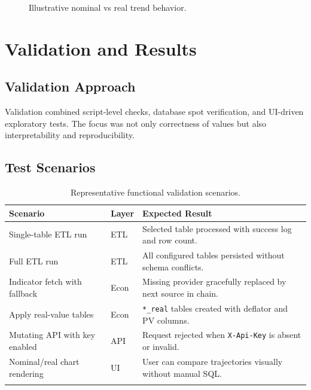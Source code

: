 \documentclass[12pt,a4paper]{report}
\begin{document}
\begin{figure}[H]
\centering
{}
\caption{Illustrative nominal vs real trend behavior.}
\end{figure}

\chapter{Validation and Results}
\section{Validation Approach}
Validation combined script-level checks, database spot verification, and UI-driven exploratory tests. The focus was not only correctness of values but also interpretability and reproducibility.

\section{Test Scenarios}
\begin{longtable}{p{}p{}p{}}
\toprule
\textbf{Scenario} & \textbf{Layer} & \textbf{Expected Result} \\
\midrule
Single-table ETL run & ETL & Selected table processed with success log and row count. \\
Full ETL run & ETL & All configured tables persisted without schema conflicts. \\
Indicator fetch with fallback & Econ & Missing provider gracefully replaced by next source in chain. \\
Apply real-value tables & Econ & \texttt{*\_real} tables created with deflator and PV columns. \\
Mutating API with key enabled & API & Request rejected when \texttt{X-Api-Key} is absent or invalid. \\
Nominal/real chart rendering & UI & User can compare trajectories visually without manual SQL. \\
\bottomrule
\caption{Representative functional validation scenarios.}
\end{longtable}
\end{document}
